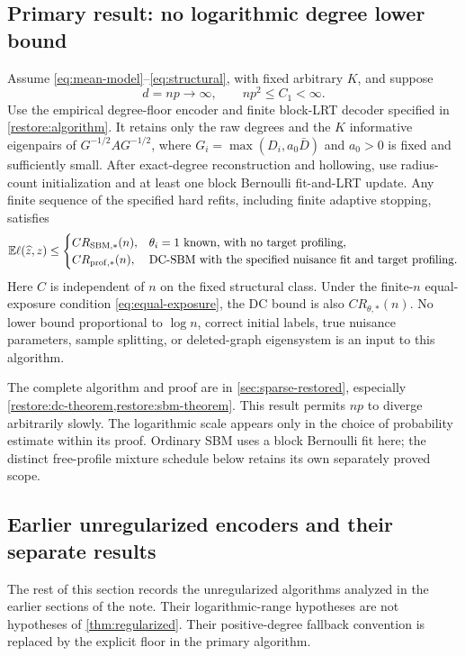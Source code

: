 \subsection{Primary result: no logarithmic degree lower bound}

\begin{theorem}
\label{thm:regularized}
Assume \eqref{eq:mean-model}--\eqref{eq:structural}, with fixed arbitrary
$K$, and suppose
\[
 d=np\longrightarrow\infty,\qquad np^2\le C_1<\infty.
\]
Use the empirical degree-floor encoder and finite block-LRT decoder
specified in \cref{restore:algorithm}. It retains only the raw degrees
and the $K$ informative eigenpairs of $G^{-1/2}AG^{-1/2}$, where
$G_i=\max(D_i,a_0\bar D)$ and $a_0>0$ is fixed and sufficiently small.
After exact-degree reconstruction and hollowing, use radius-count
initialization and at least one block Bernoulli fit-and-LRT update.
Any finite sequence of the specified hard refits, including finite
adaptive stopping, satisfies
\[
 \mathbb E\ell(\widehat z,z)\le
 \begin{cases}
 C R_{\mathrm{SBM},*}(n),&
    \theta_i=1\text{ known, with no target profiling},\\
 C R_{\mathrm{prof},*}(n),&
    \text{DC-SBM with the specified nuisance fit and target profiling}.
 \end{cases}
\]
Here $C$ is independent of $n$ on the fixed structural class.
Under the finite-$n$ equal-exposure condition
\eqref{eq:equal-exposure}, the DC bound is also
$C R_{\theta,*}(n)$. No lower bound proportional to $\log n$,
correct initial labels, true nuisance parameters, sample splitting,
or deleted-graph eigensystem is an input to this algorithm.
\end{theorem}

The complete algorithm and proof are in \cref{sec:sparse-restored},
especially \cref{restore:dc-theorem,restore:sbm-theorem}.
This result permits $np$ to diverge arbitrarily slowly. The
logarithmic scale appears only in the choice of probability estimate
within its proof. Ordinary SBM uses a block Bernoulli fit here;
the distinct free-profile mixture schedule below retains its own
separately proved scope.

\subsection{Earlier unregularized encoders and their separate results}

The rest of this section records the unregularized algorithms analyzed
in the earlier sections of the note. Their logarithmic-range hypotheses
are not hypotheses of \cref{thm:regularized}. Their positive-degree
fallback convention is replaced by the explicit floor in the primary
algorithm.

